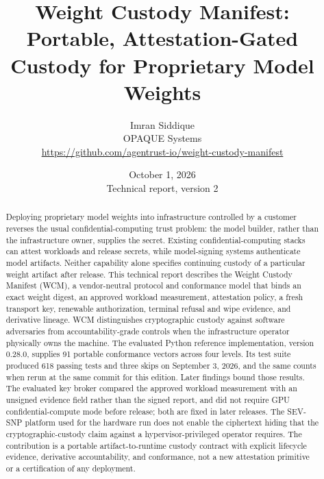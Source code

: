 \documentclass[10pt,letterpaper]{article}
\title{\textbf{Weight Custody Manifest: Portable, Attestation-Gated Custody for Proprietary Model Weights}}
\author{
  Imran Siddique \\
  OPAQUE Systems \\[4pt]
  \normalsize \url{https://github.com/agentrust-io/weight-custody-manifest}
}
\date{October 1, 2026 \\ \small Technical report, version 2}
\begin{document}
\maketitle

\begin{abstract}
Deploying proprietary model weights into infrastructure controlled by a customer reverses the usual confidential-computing trust problem: the model builder, rather than the infrastructure owner, supplies the secret. Existing confidential-computing stacks can attest workloads and release secrets, while model-signing systems authenticate model artifacts. Neither capability alone specifies continuing custody of a particular weight artifact after release. This technical report describes the Weight Custody Manifest (WCM), a vendor-neutral protocol and conformance model that binds an exact weight digest, an approved workload measurement, attestation policy, a fresh transport key, renewable authorization, terminal refusal and wipe evidence, and derivative lineage. WCM distinguishes cryptographic custody against software adversaries from accountability-grade controls when the infrastructure operator physically owns the machine. The evaluated Python reference implementation, version 0.28.0, supplies 91 portable conformance vectors across four levels. Its test suite produced 618 passing tests and three skips on September 3, 2026, and the same counts when rerun at the same commit for this edition. Later findings bound those results. The evaluated key broker compared the approved workload measurement with an unsigned evidence field rather than the signed report, and did not require GPU confidential-compute mode before release; both are fixed in later releases. The SEV-SNP platform used for the hardware run does not enable the ciphertext hiding that the cryptographic-custody claim against a hypervisor-privileged operator requires. The contribution is a portable artifact-to-runtime custody contract with explicit lifecycle evidence, derivative accountability, and conformance, not a new attestation primitive or a certification of any deployment.
\end{abstract}
\end{document}
